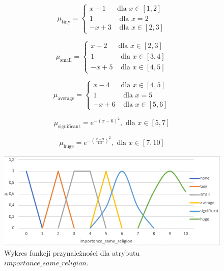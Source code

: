 \documentclass{classrep}
\begin{document}
\begin{enumerate}
    \begin{equation}
      \mu_{\text{tiny}} =
        \begin{cases}
          x-1 & \text{dla } x \in [1,2] \\
          1 & \text{ dla } x =2 \\
          -x+3 & \text{ dla } x \in [2,3]       
        \end{cases}  
    \end{equation}

    \begin{equation}
      \mu_{\text{small}} =
        \begin{cases}
          x-2 & \text{dla } x \in [2,3] \\
          1 & \text{ dla } x \in [3,4] \\
          -x+5 & \text{ dla } x \in [4,5]       
        \end{cases}  
    \end{equation}

    \begin{equation}
      \mu_{\text{average}} =
        \begin{cases}
          x-4 & \text{dla } x \in [4,5] \\
          1 & \text{ dla } x =5 \\
          -x+6 & \text{ dla } x \in [5,6]       
        \end{cases}  
    \end{equation}

    \begin{equation}
      \mu_{\text{significant}} = e^{-{(x-6)}^2}, \text{ dla } x \in [5,7]
    \end{equation}

    \begin{equation}
      \mu_{\text{huge}} = e^{-(\frac{x-9}{1.5})^2}, \text{ dla } x \in [7,10]
    \end{equation}

      \begin{figure}[H]
      \includegraphics{fp_rel.png}
      \caption{Wykres funkcji przynależności dla atrybutu \(importance\_same\_religion\).}
      \end{figure}
  


\end{enumerate}
\end{document}
